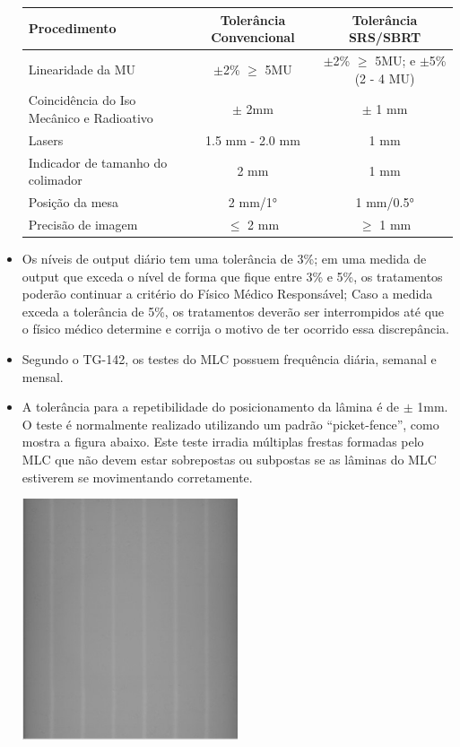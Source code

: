 \documentclass[11pt,a4paper]{article}
\newcounter{exemplo}
\begin{document}
\begin{exemplo}[Qualidade]
\begin{itemize}
        \begin{center}
            \begin{tabular}[h]{lcc}
                \toprule
                Procedimento & Tolerância Convencional & Tolerância SRS/SBRT \\
                \midrule
                Linearidade da MU & $\pm$2\% $\geq$ 5MU & $\pm$2\% $\geq$ 5MU; e $\pm$5\% (2 - 4 MU)\\
                Coincidência do Iso Mecânico e Radioativo & $\pm$ 2mm & $\pm$ 1 mm \\
                Lasers & 1.5 mm - 2.0 mm & 1 mm \\
                Indicador de tamanho do colimador & 2 mm & 1 mm \\
                Posição da mesa & 2 mm/\ang{1} & 1 mm/\ang{0.5} \\
                Precisão de imagem & $\leq$ 2 mm & $\geq$ 1 mm \\
                \bottomrule
                \bottomrule
            \end{tabular}
        \end{center}

        \item Os níveis de output diário tem uma tolerância de 3\%; em uma medida de output que exceda o nível de forma que fique entre 3\% e 5\%, os tratamentos poderão continuar a critério do Físico Médico Responsável; Caso a medida exceda a tolerância de 5\%, os tratamentos deverão ser interrompidos até que o físico médico determine e corrija o motivo de ter ocorrido essa discrepância.
        
        \item Segundo o TG-142, os testes do MLC possuem frequência diária, semanal e mensal.
        
        \item A tolerância para a repetibilidade do posicionamento da lâmina é de $\pm$ 1mm. O teste é normalmente realizado utilizando um padrão ``picket-fence'', como mostra a figura abaixo. Este teste irradia múltiplas frestas formadas pelo MLC que não devem estar sobrepostas ou subpostas se as lâminas do MLC estiverem se movimentando corretamente.
        
        \begin{center}
            \includegraphics[width=0.5\textwidth]{Imagens/picketfence.jpg}
        \end{center}


\end{itemize}
\end{exemplo}
\end{document}
